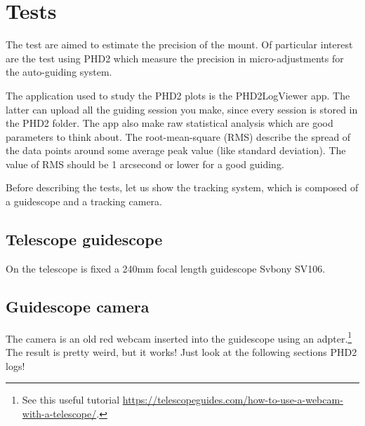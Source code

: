 \section{Tests}
\label{sec:tests}


The test are aimed to estimate the precision of the mount.
Of particular interest are the test using PHD2 which measure the precision in micro-adjustments for the auto-guiding system.

The application used to study the PHD2 plots is the PHD2LogViewer app.
The latter can upload all the guiding session you make, since every session is stored in the PHD2 folder.
The app also make raw statistical analysis which are good parameters to think about.
The root-mean-square (RMS) describe the spread of the data points around some average peak value (like standard deviation).
The value of RMS should be 1 arcsecond or lower for a good guiding.

Before describing the tests, let us show the tracking system, which is composed of a guidescope and a tracking camera.

\subsection{Telescope guidescope}
On the telescope is fixed a 240mm focal length guidescope Svbony SV106.

\subsection{Guidescope camera}
The camera is an old red webcam inserted into the guidescope using an adpter.\footnote{See this useful tutorial \url{https://telescopeguides.com/how-to-use-a-webcam-with-a-telescope/}.}
The result is pretty weird, but it works!
Just look at the following sections PHD2 logs!


